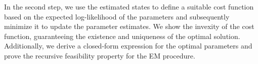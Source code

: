 In the second step, we use the estimated states to define a suitable cost function based on the expected log-likelihood of the parameters and subsequently minimize it to update the parameter estimates.
%
We show the invexity of the cost function, guaranteeing the existence and uniqueness of the optimal solution. Additionally, we derive a closed-form expression for the optimal parameters and prove the recursive feasibility property for the EM procedure. 
%
